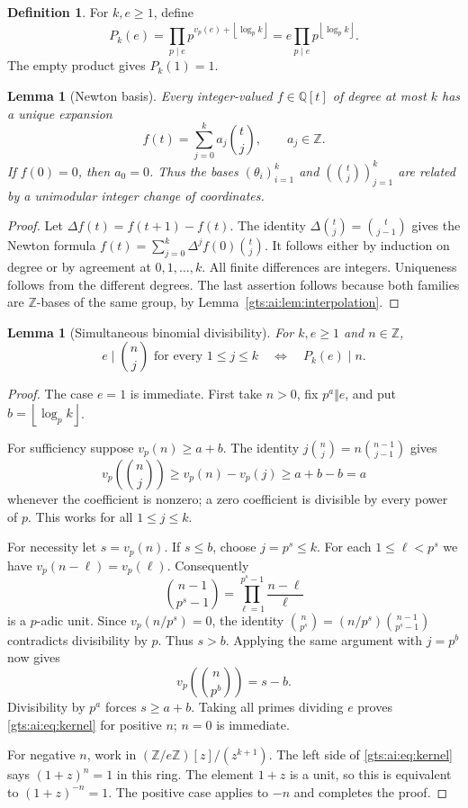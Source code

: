 \documentclass[11pt,letterpaper]{article}
\newtheorem{lemma}[theorem]{Lemma}
\theoremstyle{definition}
\newtheorem{definition}[theorem]{Definition}
\theoremstyle{remark}
\newcommand{\Z}{\mathbb Z}
\newcommand{\floor}[1]{\left\lfloor #1\right\rfloor}
\newcommand{\Q}{\mathbb Q}
\begin{document}
\begin{definition}
For $k,e\ge1$, define
\begin{equation}\label{gts:ai:eq:period}
 P_k(e)=\prod_{p\mid e}p^{v_p(e)+\floor{\log_p k}}
       =e\prod_{p\mid e}p^{\floor{\log_p k}}.
\end{equation}
The empty product gives $P_k(1)=1$.
\end{definition}
\begin{lemma}[Newton basis]\label{gts:ai:lem:newton}
Every integer-valued $f\in\Q[t]$ of degree at most $k$ has a unique expansion
\[
 f(t)=\sum_{j=0}^k a_j\binom tj,\qquad a_j\in\Z.
\]
If $f(0)=0$, then $a_0=0$. Thus the bases
$(\theta_i)_{i=1}^k$ and $(\binom tj)_{j=1}^k$ are related by a unimodular integer change of coordinates.
\end{lemma}
\begin{proof}
Let $\Delta f(t)=f(t+1)-f(t)$. The identity
$\Delta\binom tj=\binom t{j-1}$ gives the Newton formula
$f(t)=\sum_{j=0}^k\Delta^j f(0)\binom tj$. It follows either by induction on degree or by agreement at $0,1,\ldots,k$. All finite differences are integers. Uniqueness follows from the different degrees. The last assertion follows because both families are $\Z$-bases of the same group, by Lemma~\ref{gts:ai:lem:interpolation}.
\end{proof}
\begin{lemma}[Simultaneous binomial divisibility]\label{gts:ai:lem:binomialperiod}
For $k,e\ge1$ and $n\in\Z$,
\begin{equation}\label{gts:ai:eq:kernel}
 e\mid\binom nj\text{ for every }1\le j\le k
 \quad\Longleftrightarrow\quad P_k(e)\mid n.
\end{equation}
\end{lemma}
\begin{proof}
The case $e=1$ is immediate. First take $n>0$, fix $p^a\Vert e$, and put $b=\floor{\log_p k}$.

For sufficiency suppose $v_p(n)\ge a+b$. The identity
$j\binom nj=n\binom{n-1}{j-1}$ gives
\[
 v_p\left(\binom nj\right)\ge v_p(n)-v_p(j)\ge a+b-b=a
\]
whenever the coefficient is nonzero; a zero coefficient is divisible by every power of $p$. This works for all $1\le j\le k$.

For necessity let $s=v_p(n)$. If $s\le b$, choose $j=p^s\le k$. For each $1\le\ell<p^s$ we have $v_p(n-\ell)=v_p(\ell)$. Consequently
\[
 \binom{n-1}{p^s-1}=\prod_{\ell=1}^{p^s-1}\frac{n-\ell}{\ell}
\]
is a $p$-adic unit. Since $v_p(n/p^s)=0$, the identity
$\binom n{p^s}=(n/p^s)\binom{n-1}{p^s-1}$ contradicts divisibility by $p$. Thus $s>b$. Applying the same argument with $j=p^b$ now gives
\[
 v_p\left(\binom n{p^b}\right)=s-b.
\]
Divisibility by $p^a$ forces $s\ge a+b$. Taking all primes dividing $e$ proves \eqref{gts:ai:eq:kernel} for positive $n$; $n=0$ is immediate.

For negative $n$, work in $(\Z/e\Z)[z]/(z^{k+1})$. The left side of \eqref{gts:ai:eq:kernel} says $(1+z)^n=1$ in this ring. The element $1+z$ is a unit, so this is equivalent to $(1+z)^{-n}=1$. The positive case applies to $-n$ and completes the proof.
\end{proof}
\end{document}
